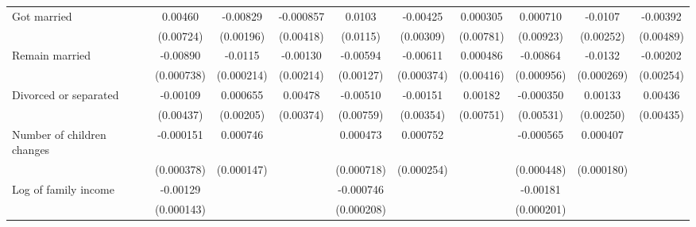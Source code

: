 {\begin{tabular}{l*{9}{c}}
\addlinespace
Got married         &     0.00460         &    -0.00829\sym{***}&   -0.000857         &      0.0103         &    -0.00425         &    0.000305         &    0.000710         &     -0.0107\sym{***}&    -0.00392         \\
                    &   (0.00724)         &   (0.00196)         &   (0.00418)         &    (0.0115)         &   (0.00309)         &   (0.00781)         &   (0.00923)         &   (0.00252)         &   (0.00489)         \\
\addlinespace
Remain married      &    -0.00890\sym{***}&     -0.0115\sym{***}&    -0.00130         &    -0.00594\sym{***}&    -0.00611\sym{***}&    0.000486         &    -0.00864\sym{***}&     -0.0132\sym{***}&    -0.00202         \\
                    &  (0.000738)         &  (0.000214)         &   (0.00214)         &   (0.00127)         &  (0.000374)         &   (0.00416)         &  (0.000956)         &  (0.000269)         &   (0.00254)         \\
\addlinespace
Divorced or separated&    -0.00109         &    0.000655         &     0.00478         &    -0.00510         &    -0.00151         &     0.00182         &   -0.000350         &     0.00133         &     0.00436         \\
                    &   (0.00437)         &   (0.00205)         &   (0.00374)         &   (0.00759)         &   (0.00354)         &   (0.00751)         &   (0.00531)         &   (0.00250)         &   (0.00435)         \\
\addlinespace
Number of children changes&   -0.000151         &    0.000746\sym{***}&                     &    0.000473         &    0.000752\sym{***}&                     &   -0.000565         &    0.000407\sym{**} &                     \\
                    &  (0.000378)         &  (0.000147)         &                     &  (0.000718)         &  (0.000254)         &                     &  (0.000448)         &  (0.000180)         &                     \\
\addlinespace
Log of family income&    -0.00129\sym{***}&                     &                     &   -0.000746\sym{***}&                     &                     &    -0.00181\sym{***}&                     &                     \\
                    &  (0.000143)         &                     &                     &  (0.000208)         &                     &                     &  (0.000201)         &                     &                     \\

\end{tabular}}
